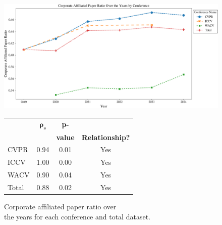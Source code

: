 \documentclass{article}
\begin{document}
\begin{figure}[ht]
  \centering
  \begin{minipage}{0.5\textwidth}
    \centering
    \includegraphics[width=\textwidth]{report/images/corporate_ratio_graph_final.png}
    \label{fig:corporate_ratio_graph}
    \vfill  %
  \end{minipage}%
  \hfill
  \begin{minipage}{0.45\textwidth}
    \centering
    \begin{tabular}{|l|c|c|c|}
      \hline
      \textbf{ } & \( \bm{\rho}_\bm{s} \) & \textbf{p-} & {\textbf{Significant}\\ \textbf{}&\textbf{}&\textbf{value}&\textbf{Relationship?}} \\ \hline
      CVPR & 0.94 & 0.01 & Yes \\ \hline
      ICCV & 1.00 & 0.00 & Yes \\ \hline
      WACV & 0.90 & 0.04 & Yes \\ \hline
      Total & 0.88 & 0.02 & Yes \\ \hline
    \end{tabular}
    \label{tab:spearman_results}
    \vfill  %
  \end{minipage}

  \vspace{-10pt} %
  \begin{minipage}{0.5\textwidth}
    \caption{Corporate affiliated paper ratio over \\ the years for each conference and total dataset.}
    \label{fig:corporate_ratio_graph}
  \end{minipage}%
  \hfill

\end{figure}
\end{document}
